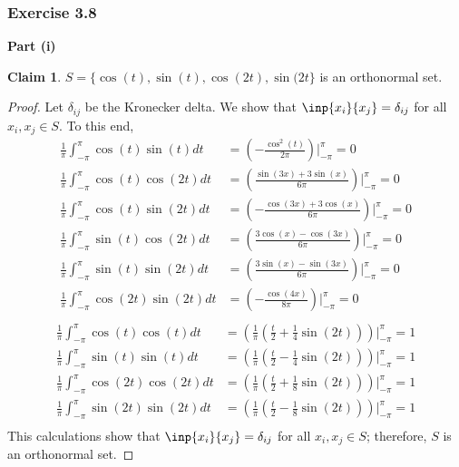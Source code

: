 \documentclass[letterpaper,12pt]{article}
\theoremstyle{definition}
\newtheorem{claim}[theorem]{Claim}
\begin{document}
\subsubsection*{Exercise 3.8}
\noindent\textbf{Part (i)}
\begin{claim}
	$S = \{\cos(t), \sin(t), \cos(2t), \sin(2t\}$ is an orthonormal set.
\end{claim}
\begin{proof}
Let $\delta_{ij}$ be the Kronecker delta. We show that $\inp{x_i}{x_j} = \delta_{ij}$ for all $x_i, x_j \in S$. To this end,
\begin{align*}
	\frac{1}{\pi} \int_{-\pi}^{\pi} \cos(t) \sin(t) dt &= \left(- \frac{\cos^2(t)}{2\pi} \right) \bigg\rvert_{-\pi}^{\pi} = 0  \\
	\frac{1}{\pi} \int_{-\pi}^{\pi} \cos(t) \cos(2t) dt &= \left(\frac{\sin(3x) + 3 \sin(x)}{6\pi} \right) \bigg\rvert_{-\pi}^{\pi} = 0  \\
	\frac{1}{\pi} \int_{-\pi}^{\pi} \cos(t) \sin(2t) dt &= \left(- \frac{\cos(3x) + 3\cos(x)}{6\pi} \right) \bigg\rvert_{-\pi}^{\pi} = 0  \\
	\frac{1}{\pi} \int_{-\pi}^{\pi} \sin(t) \cos(2t) dt &= \left(\frac{3\cos(x) - \cos(3x) }{6\pi} \right) \bigg\rvert_{-\pi}^{\pi} = 0  \\
	\frac{1}{\pi} \int_{-\pi}^{\pi} \sin(t) \sin(2t) dt &= \left(\frac{3\sin(x) - \sin(3x) }{6\pi} \right) \bigg\rvert_{-\pi}^{\pi} = 0  \\
	\frac{1}{\pi} \int_{-\pi}^{\pi} \cos(2t) \sin(2t) dt &= \left(-\frac{\cos(4x)}{8\pi} \right) \bigg\rvert_{-\pi}^{\pi} = 0  \\
\end{align*}
\begin{align*}
	\frac{1}{\pi} \int_{-\pi}^{\pi} \cos(t) \cos(t) dt &= \left(\frac{1}{\pi}\left( \frac{t}{2} + \frac{1}{4} \sin(2t) \right) \right) \bigg\rvert_{-\pi}^{\pi} = 1  \\
	\frac{1}{\pi} \int_{-\pi}^{\pi} \sin(t) \sin(t) dt &= \left(\frac{1}{\pi}\left( \frac{t}{2} - \frac{1}{4} \sin(2t) \right) \right) \bigg\rvert_{-\pi}^{\pi} = 1  \\
	\frac{1}{\pi} \int_{-\pi}^{\pi} \cos(2t) \cos(2t) dt &= \left(\frac{1}{\pi}\left( \frac{t}{2} + \frac{1}{8} \sin(2t) \right) \right) \bigg\rvert_{-\pi}^{\pi} = 1  \\
	\frac{1}{\pi} \int_{-\pi}^{\pi} \sin(2t) \sin(2t) dt &= \left(\frac{1}{\pi}\left( \frac{t}{2} - \frac{1}{8} \sin(2t) \right) \right) \bigg\rvert_{-\pi}^{\pi} = 1  \\
\end{align*}
This calculations show that $\inp{x_i}{x_j} = \delta_{ij}$ for all $x_i, x_j \in S$; therefore, $S$ is an orthonormal set.
\end{proof}
\end{document}
